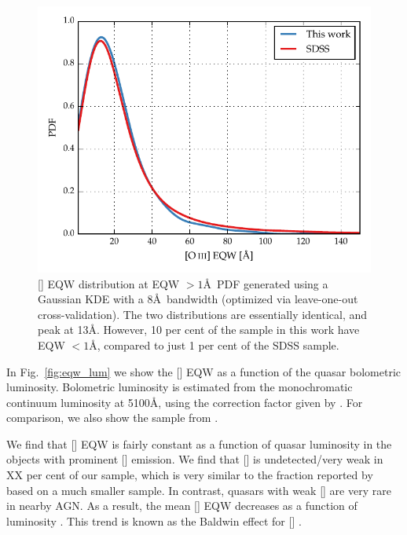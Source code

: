 \begin{figure}[t!]
    \includegraphics[width=\columnwidth]{figures/chapter04/high_eqw_comp.pdf} 
    \caption[{}]{[] EQW distribution at EQW $>1$\AA\, PDF generated using a Gaussian KDE with a 8\AA\, bandwidth (optimized via leave-one-out cross-validation). The two distributions are essentially identical, and peak at 13\AA. However, 10 per cent of the sample in this work have EQW $<1$\AA, compared to just 1 per cent of the SDSS sample.}     
    \label{fig:high_eqw_comp}
\end{figure}

In Fig.~\ref{fig:eqw_lum} we show the [] EQW as a function of the quasar bolometric luminosity. 
Bolometric luminosity is estimated from the monochromatic continuum luminosity at 5100\AA, using the correction factor given by \citet{richards06}. 
For comparison, we also show the sample from \citet{shen11}.  

We find that [] EQW is fairly constant as a function of quasar luminosity in the objects with prominent [] emission. 
We find that [] is undetected/very weak in XX per cent of our sample, which is very similar to the fraction reported by \citet{netzer04} based on a much smaller sample.  
In contrast, quasars with weak [] are very rare in nearby AGN. 
As a result, the mean [] EQW decreases as a function of luminosity \citep[e.g.][]{brotherton96,netzer04,sulentic04,baskin05b}. 
This trend is known as the Baldwin effect for [] \citep[e.g.][]{baldwin77,brotherton96,zhang11,stern12}. 

